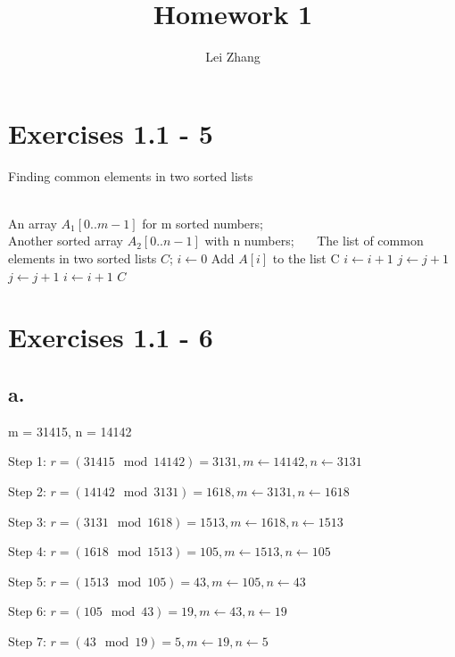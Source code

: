 \documentclass{article}
\title{Homework 1}
\author{Lei Zhang}
\begin{document}
\maketitle

\section{Exercises 1.1 - 5}

\begin{algorithm}
\caption{Finding common elements in two sorted lists}
\begin{algorithmic}[1]
\INPUT\\
An array $A_1[0..m-1]$ for m sorted numbers;\\
Another sorted array $A_2[0..n-1]$ with n numbers;
\OUTPUT ~~\
The list of common elements in two sorted lists $C$;
\State $ i \leftarrow 0 $
\State Add $A[i]$ to the list C
\State $i \leftarrow i + 1$
\State $j \leftarrow j + 1$
\State $j \leftarrow j + 1$
\Else
\State $i \leftarrow i +1$
\EndIf
\EndWhile
\State \Return $C$
\end{algorithmic}
\end{algorithm}

\section{Exercises 1.1 - 6}

\subsection*{a.}

m = 31415, n = 14142

Step 1: $r = (31415 \mod 14142) = 3131, m \leftarrow 14142, n \leftarrow 3131 $

Step 2: $r = (14142 \mod 3131) = 1618, m \leftarrow 3131, n \leftarrow 1618 $

Step 3: $r = (3131 \mod 1618) = 1513, m \leftarrow 1618, n \leftarrow 1513 $

Step 4: $r = (1618 \mod 1513) = 105, m \leftarrow 1513, n \leftarrow 105 $

Step 5: $r = (1513 \mod 105)= 43, m \leftarrow 105, n \leftarrow 43 $

Step 6: $r = (105 \mod 43) = 19, m \leftarrow 43, n \leftarrow 19 $

Step 7: $r = (43 \mod 19) = 5, m \leftarrow 19, n \leftarrow 5 $
\end{document}
